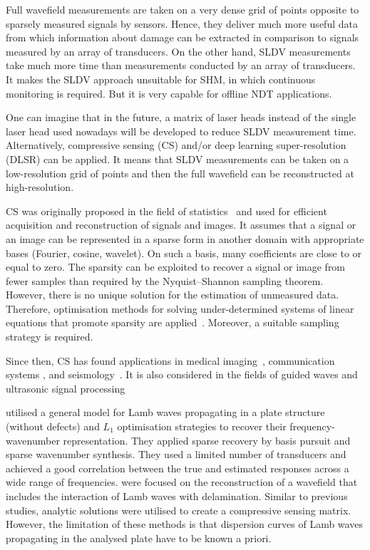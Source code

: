 Full wavefield measurements are taken on a very dense grid of points opposite to sparsely measured signals by sensors.
Hence, they deliver much more useful data from which information about damage can be extracted in comparison to signals measured by an array of transducers.
On the other hand, SLDV measurements take much more time than measurements conducted by an array of transducers.
It makes the SLDV approach unsuitable for SHM, in which continuous monitoring is required.
But it is very capable for offline NDT applications.

One can imagine that in the future, a matrix of laser heads instead of the single laser head used nowadays will be developed to reduce SLDV measurement time.
Alternatively, compressive sensing (CS) and/or deep learning super-resolution (DLSR) can be applied.
It means that SLDV measurements can be taken on a low-resolution grid of points and then the full wavefield can be reconstructed at high-resolution.

CS was originally proposed in the field of statistics~\cite{Candes2006,Donoho2006} and used for efficient acquisition and reconstruction of signals and images.
It assumes that a signal or an image can be represented in a sparse form in another domain with appropriate bases (Fourier, cosine, wavelet).
On such a basis, many coefficients are close to or equal to zero.
The sparsity can be exploited to recover a signal or image from fewer samples than required by the Nyquist–Shannon sampling theorem.
However, there is no unique solution for the estimation of unmeasured data.
Therefore, optimisation methods for solving under-determined systems of linear equations that promote sparsity are applied~\cite{Chen1998,VanEwoutBerg2008,VandenBerg2019}.
Moreover, a suitable sampling strategy is required.

Since then, CS has found applications in medical imaging~\cite{Lustig2007}, communication systems \cite{Gao2018}, and seismology~\cite{Herrmann2012}.
It is also considered in the fields of guided waves and ultrasonic signal processing~\cite{Harley2013,Mesnil2016,Perelli2012,Perelli2015,DiIanni2015,KeshmiriEsfandabadi2018,Chang2020}

\textcite{Harley2013} utilised a general model for Lamb waves propagating in a plate structure (without defects) and $L_1$ optimisation strategies to recover their frequency-wavenumber representation.
They applied sparse recovery by basis pursuit and sparse wavenumber synthesis.
They used a limited number of transducers and achieved a good correlation between the true and estimated responses across a wide range of frequencies.
\textcite{Mesnil2016} were focused on the reconstruction of a wavefield that includes the interaction of Lamb waves with delamination.
Similar to previous studies, analytic solutions were utilised to create a compressive sensing matrix.
However, the limitation of these methods is that dispersion curves of Lamb waves propagating in the analysed plate have to be known a priori.

